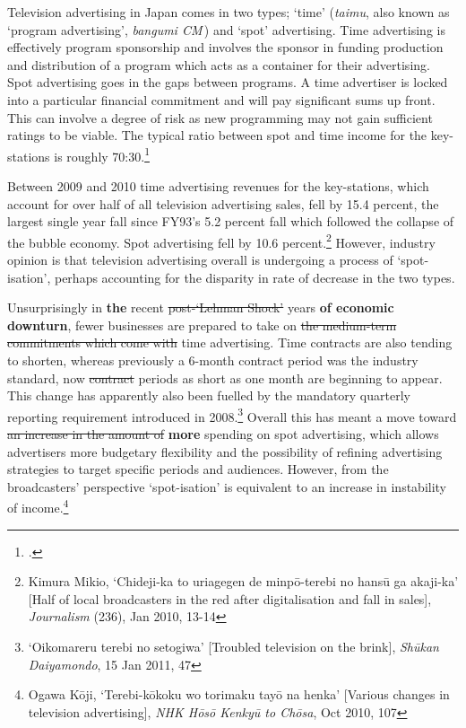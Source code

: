 \documentclass[11pt, oneside, a4paper, headsepline]{scrartcl}
\newcommand{\citej}[2] {\footcite[\nopp #1]{#2} }
\begin{document}
\bigskip

Television advertising in Japan comes in two types; `time' (\emph{taimu}, also known as `program advertising', \textit{bangumi CM}\,) and `spot' advertising. Time advertising is effectively program sponsorship and involves the sponsor in funding production and distribution of a program which acts as a container for their advertising. Spot advertising goes in the gaps between programs. A time advertiser is locked into a particular financial commitment and will pay significant sums up front. This can involve a degree of risk as new programming may not gain sufficient ratings to be viable. The typical ratio between spot and time income for the key-stations is roughly 70:30.\citej{155}{Nakano:2008}

Between 2009 and 2010 time advertising revenues for the key-stations, which account for over half of all television advertising sales, fell by 15.4 percent, the largest single year fall since FY93's 5.2 percent fall which followed the collapse of the bubble economy. Spot advertising fell by 10.6 percent.\footnote{Kimura Mikio, `Chideji-ka to uriagegen de minp\={o}-terebi no hans\={u} ga akaji-ka' [Half of local broadcasters in the red after digitalisation and fall in sales], \emph{Journalism} (236), Jan 2010, 13-14\label{note:uriagegen}} However, industry opinion is that television advertising overall is undergoing a process of `spot-isation',  perhaps accounting for the disparity in rate of decrease in the two types.

Unsurprisingly in {\bf the} recent \st{post-`Lehman Shock'} years {\bf of economic downturn}, fewer businesses are prepared to take on \st{the medium-term commitments which come with} time advertising. Time contracts are also tending to shorten, whereas previously a 6-month contract period was the industry standard, now \st{contract} periods as short as one month are beginning to appear. This change has apparently also been fuelled by the mandatory quarterly reporting requirement introduced in 2008.\footnote{`Oikomareru terebi no setogiwa' [Troubled television on the brink], \emph{Sh\={u}kan Daiyamondo}, 15 Jan 2011, 47} Overall this has meant a move toward \st{an increase in the amount of} \textbf{more} spending on spot advertising, which allows advertisers more budgetary flexibility and the possibility of refining advertising strategies to target specific periods and audiences. However, from the broadcasters' perspective `spot-isation' is equivalent to an increase in instability of income.\footnote{Ogawa K\={o}ji, `Terebi-k\={o}koku wo torimaku tay\={o} na henka' [Various changes in television advertising], \emph{NHK H\={o}s\={o} Kenky\={u} to Ch\={o}sa}, Oct 2010, 107}
\end{document}
